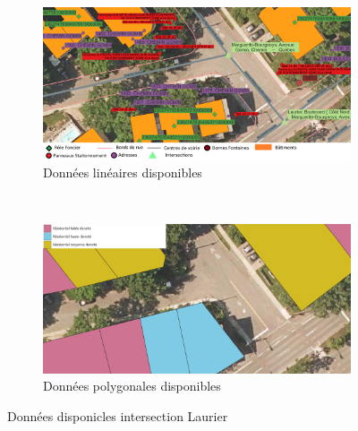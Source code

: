       \begin{figure}[ht]
        \centering
        \begin{subfigure}{\linewidth}
          \includegraphics[width=1.0\textwidth]{images/donnees_disponible_Laurier_legende_v2.png}
        \caption{Données linéaires disponibles}
        \label{fig:donnes_panneaux_Laurier}
        \end{subfigure} \\
        \begin{subfigure}{\linewidth}
          \includegraphics[width=1.0\textwidth]{images/utilisation_sols_Laurier_v2.png}
        \caption{Données polygonales disponibles}
        \label{fig:donnes_polygone_panneaux_Laurier}
        \end{subfigure}
        \caption{Données disponicles intersection Laurier}
      \end{figure}

      \FloatBarrier
